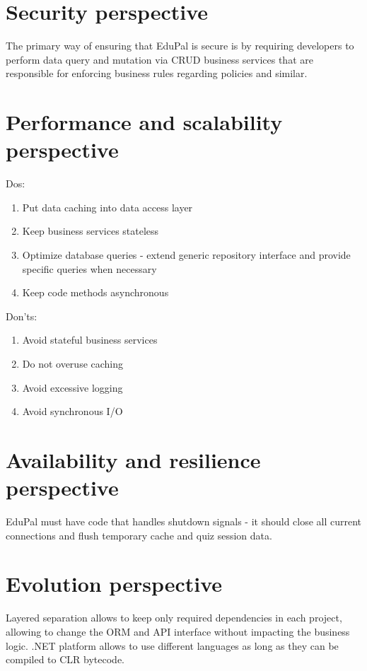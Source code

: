 \section{Security perspective}

The primary way of ensuring that EduPal is secure is by requiring developers to perform data query and mutation via CRUD business services that are responsible for enforcing business rules regarding policies and similar.

\section{Performance and scalability perspective}

Dos:

\begin{enumerate}
  \item Put data caching into data access layer
  \item Keep business services stateless
  \item Optimize database queries - extend generic repository interface and provide specific queries when necessary
  \item Keep code methods asynchronous
\end{enumerate}

Don'ts:

\begin{enumerate}
  \item Avoid stateful business services
  \item Do not overuse caching
  \item Avoid excessive logging
  \item Avoid synchronous I/O
\end{enumerate}

\section{Availability and resilience perspective}

EduPal must have code that handles shutdown signals - it should close all current connections and flush temporary cache and quiz session data.

\section{Evolution perspective}

Layered separation allows to keep only required dependencies in each project, allowing to change the ORM and API interface without impacting the business logic. .NET platform allows to use different languages as long as they can be compiled to CLR bytecode.

